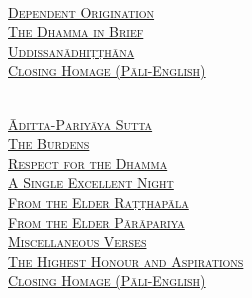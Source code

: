 {  \clearpage

  {\libertinusFont\selectfont\textbf{\textsc{\fontsize{18}{12}\selectfont{}}}}\\

  \textsc{\fontsize{14.4}{28}\selectfont
    \hyperref[dependent-origination]{Dependent Origination} \ifdesktopversion\else\pageref{dependent-origination}\fi\\
    \hyperref[dhamma-in-brief]{The Dhamma in Brief} \ifdesktopversion\else\pageref{dhamma-in-brief}\fi\\
    \hyperref[uddissanadhitthana]{Uddissanādhiṭṭhāna} \ifdesktopversion\else\pageref{uddissanadhitthana}\fi\\
    \hyperref[closing-homage]{Closing Homage (Pāli-English)} \ifdesktopversion\else\pageref{closing-homage}\fi\\
  }

  \vspace{1.0cm}

  {\libertinusFont\selectfont\textbf{\textsc{\fontsize{18}{12}\selectfont{}}}}\\

  \textsc{\fontsize{14.4}{28}\selectfont
    \hyperref[aditta-pariyaya]{Āditta-Pariyāya Sutta} \ifdesktopversion\else\pageref{aditta-pariyaya}\fi\\
    \hyperref[burdens]{The Burdens} \ifdesktopversion\else\pageref{burdens}\fi\\
    \hyperref[respect-for-the-dhamma]{Respect for the Dhamma} \ifdesktopversion\else\pageref{respect-for-the-dhamma}\fi\\
    \hyperref[single-excellent-night]{A Single Excellent Night} \ifdesktopversion\else\pageref{single-excellent-night}\fi\\
    \hyperref[ratthapala]{From the Elder Raṭṭhapāla}  \ifdesktopversion\else\pageref{ratthapala}\fi\\
    \hyperref[parapariya]{From the Elder Pārāpariya} \ifdesktopversion\else\pageref{parapariya}\fi\\
    \hyperref[misc-verses]{Miscellaneous Verses} \ifdesktopversion\else\pageref{misc-verses}\fi\\
    \hyperref[highest-honour-aspirations]{The Highest Honour and Aspirations} \ifdesktopversion\else\pageref{highest-honour-aspirations}\fi\\
    \hyperref[closing-homage]{Closing Homage (Pāli-English)} \ifdesktopversion\else\pageref{closing-homage}\fi\\
  }

}
